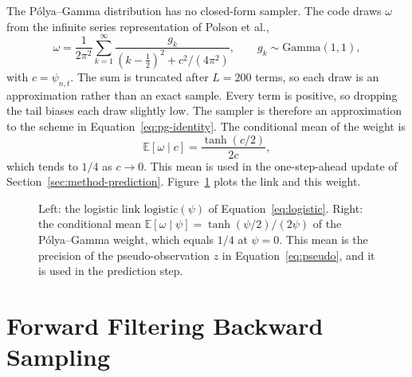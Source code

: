 The P\'olya--Gamma distribution has no closed-form sampler. The code draws $\omega$ from the infinite
series representation of Polson et al.,
\begin{equation}\label{eq:pg-series}
  \omega = \frac{1}{2\pi^2}\sum_{k=1}^{\infty}
  \frac{g_k}{(k-\tfrac{1}{2})^2 + c^2/(4\pi^2)},
  \qquad g_k \sim \mathrm{Gamma}(1,1),
\end{equation}
with $c = \psi_{n,t}$. The sum is truncated after $L = 200$ terms, so each draw is an approximation rather than an exact sample. Every term is positive, so dropping the tail biases each draw slightly low. The sampler is therefore an approximation to the scheme in Equation~\eqref{eq:pg-identity}. The conditional mean of the weight is
\begin{equation}\label{eq:pg-mean}
  \mathbb E[\omega \mid c] = \frac{\tanh(c/2)}{2c},
\end{equation}
which tends to $1/4$ as $c \to 0$. This mean is used in the one-step-ahead update of Section~\ref{sec:method-prediction}. Figure~\ref{fig:tk_pg_logistic} plots the link and this weight.

\begin{figure}[htbp]
  \centering
  
  \caption{Left: the logistic link $\mathrm{logistic}(\psi)$ of Equation~\eqref{eq:logistic}.
    Right: the conditional mean $\mathbb E[\omega \mid \psi] = \tanh(\psi/2)/(2\psi)$ of the
    P\'olya--Gamma weight, which equals $1/4$ at $\psi = 0$. This mean is the precision of the
    pseudo-observation $z$ in Equation~\eqref{eq:pseudo}, and it is used in the prediction step.}
  \label{fig:tk_pg_logistic}
\end{figure}

\section{Forward Filtering Backward Sampling}
\label{sec:method-ffbs}

